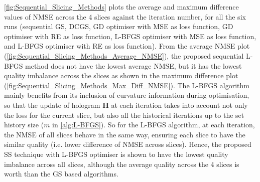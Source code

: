 \cref{fig:Sequential_Slicing_Methods} plots the average and maximum difference values of NMSE across the 4 slices against the iteration number, for all the six runs (sequential GS, DCGS, GD optimiser with MSE as loss function, GD optimiser with RE as loss function, L-BFGS optimiser with MSE as loss function, and L-BFGS optimiser with RE as loss function). From the average NMSE plot (\cref{fig:Sequential_Slicing_Methods_Average_NMSE}), the proposed sequential L-BFGS method does not have the lowest average NMSE, but it has the lowest quality imbalance across the slices as shown in the maximum difference plot (\cref{fig:Sequential_Slicing_Methods_Max_Diff_NMSE}). The L-BFGS algorithm mainly benefits from its inclusion of curvature information during optimisation, so that the update of hologram $\textbf{H}$ at each iteration takes into account not only the loss for the current slice, but also all the historical iterations up to the set history size ($m$ in \cref{alg:L-BFGS}). So for the L-BFGS algorithm, at each iteration, the NMSE of all slices behave in the same way, ensuring each slice to have the similar quality (i.e. lower difference of NMSE across slices). Hence, the proposed SS technique with L-BFGS optimiser is shown to have the lowest quality imbalance across all slices, although the average quality across the 4 slices is worth than the GS based algorithms.



